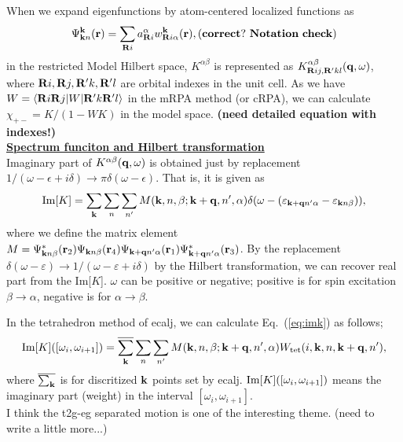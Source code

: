 \documentclass[a4paper,10pt,fleqn]{article}
\newcommand{\bfq}{{\bf q}}
\newcommand{\bfk}{{\bf k}}
\newcommand{\bfr}{{\bf r}}
\newcommand{\bfR}{{\bf R}}
\newcommand{\req}[1]{\mbox{Eq.~(\ref{#1})}}
\begin{document}
When we expand eigenfunctions by atom-centered localized functions as
\begin{eqnarray}
\Psi_{\bfk n}^\bfk(\bfr) = \sum_{\bfR i} a^\alpha_{\bfR i} w_{\bfR i \alpha}^\bfk(\bfr),
{\rm \bf (correct? \ Notation \ check)}
\end{eqnarray}
in the restricted Model Hilbert space, 
$K^{\alpha \beta}$ is represented as $K^{\alpha
\beta}_{\bfR ij,\bfR'kl}(\bfq,\omega)$, where $\bfR i,\bfR j,\bfR'
k,\bfR 'l$ are orbital indexes in the unit cell.
As we have $W=\langle \bfR i \bfR j|W|\bfR' k \bfR' l\rangle $ in the mRPA method
(or cRPA), we can calculate $\chi_{+-}={K}/(1-WK)$ in the model space.
{\bf (need detailed equation with indexes!)}\\


\noindent \underline{\bf Spectrum funciton and Hilbert transformation}\\
Imaginary part of $K^{\alpha \beta}(\bfq,\omega)$ is obtained just by
replacement $1/(\omega- \epsilon+i\delta) \rightarrow \pi \delta(\omega -\epsilon)$.
That is, it is given as
\begin{eqnarray}
{\rm Im}[K]= \sum_\bfk \sum_n \sum_{n'} M(\bfk,n,\beta;\bfk+\bfq,n',\alpha)
\delta(\omega-(\varepsilon_{\bfk+\bfq n'\alpha}-\varepsilon_{\bfk n \beta})),
\label{eq:imk}
\end{eqnarray}
where we define the matrix element 
$M=\Psi_{\bfk n \beta}^*(\bfr_2) \Psi_{{\bf k}n \beta}({\bfr}_4) 
\Psi_{{\bfk+\bfq}n' \alpha}(\bfr_1) \Psi^*_{{\bfk+\bfq}n'\alpha}(\bfr_3)$.
By the replacement $\delta(\omega-\varepsilon) \rightarrow 1/(\omega-\varepsilon
+i \delta)$ by the Hilbert transformation, we can recover real part from the Im[$K$].
$\omega$ can be positive or negative; positive is for spin excitation $\beta
\to \alpha$, negative is for $\alpha \to \beta$.

In the tetrahedron method of ecalj, we can calculate \req{eq:imk} as follows;
\begin{eqnarray}
{\rm Im}[K]([\omega_i,\omega_{i+1}])= 
\overline{\sum_\bfk} \sum_n \sum_{n'} M(\bfk,n,\beta;\bfk+\bfq,n',\alpha)
W_{\rm tet}(i,\bfk,n,\bfk+\bfq,n'),
\label{eq:imk2}
\end{eqnarray}
where $\overline{\sum_\bfk}$ is for discritized $\bfk$ points set by ecalj.
${\rm Im}[K]([\omega_i,\omega_{i+1}])$ means the imaginary part (weight)
in the interval $[\omega_i,\omega_{i+1}]$.\\


I think the t2g-eg separated motion is one of the interesting theme.
(need to write a little more...)\\
\end{document}
